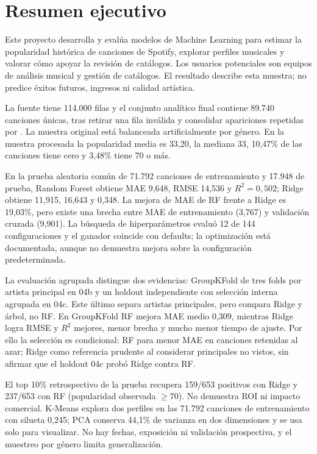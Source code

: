 \section{Resumen ejecutivo}

Este proyecto desarrolla y evalúa modelos de Machine Learning para estimar la popularidad
histórica de canciones de Spotify, explorar perfiles musicales y valorar cómo apoyar la revisión
de catálogos. Los usuarios potenciales son equipos de análisis musical y gestión de catálogos. El
resultado describe esta muestra; no predice éxitos futuros, ingresos ni calidad artística.

La fuente tiene 114.000 filas y el conjunto analítico final contiene 89.740 canciones únicas,
tras retirar una fila inválida y consolidar apariciones repetidas por . La muestra
original está balanceada artificialmente por género. En la muestra procesada la popularidad media
es 33,20, la mediana 33, 10,47\% de las canciones tiene cero y 3,48\% tiene 70 o más.

En la prueba aleatoria común de 71.792 canciones de entrenamiento y 17.948 de prueba, Random
Forest obtiene MAE 9,648, RMSE 14,536 y $R^2=0,502$; Ridge obtiene 11,915, 16,643 y 0,348. La
mejora de MAE de RF frente a Ridge es 19,03\%, pero existe una brecha entre MAE de entrenamiento
(3,767) y validación cruzada (9,901). La búsqueda de hiperparámetros evaluó 12 de 144
configuraciones y el ganador coincide con defaults; la optimización está documentada, aunque no
demuestra mejora sobre la configuración predeterminada.

La evaluación agrupada distingue dos evidencias: GroupKFold de tres folds por artista principal
en 04b y un holdout independiente con selección interna agrupada en 04c. Este último separa
artistas principales, pero compara Ridge y árbol, no RF. En GroupKFold RF mejora MAE medio 0,309,
mientras Ridge logra RMSE y $R^2$ mejores, menor brecha y mucho menor tiempo de ajuste. Por ello la
selección es condicional: RF para menor MAE en canciones retenidas al azar; Ridge como referencia
prudente al considerar principales no vistos, sin afirmar que el holdout 04c probó Ridge contra RF.

El top 10\% retrospectivo de la prueba recupera 159/653 positivos con Ridge y 237/653 con RF
(popularidad observada $\geq70$). No demuestra ROI ni impacto comercial. K-Means explora dos
perfiles en las 71.792 canciones de entrenamiento con silueta 0,245; PCA conserva 44,1\% de
varianza en dos dimensiones y se usa solo para visualizar. No hay fechas, exposición ni validación
prospectiva, y el muestreo por género limita generalización.
